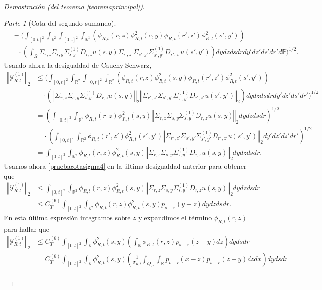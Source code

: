 \documentclass[letterpaper,twoside,12pt]{book}
\newcommand{\R}{\mathbb{R}}
\renewcommand{\P}{\mathbb{P}}
\newcommand{\1}{\mathds{1}}
\newcommand{\norm}[1]{\left\Vert #1 \right\Vert}
\theoremstyle{definition}
\theoremstyle{definition}
\theoremstyle{remark}
\newtheorem{proofpart}{Parte}
\theoremstyle{definition}
\theoremstyle{definition}
\theoremstyle{definition}
\theoremstyle{definition}
\theoremstyle{definition}
\begin{document}
\begin{proof}[Demostración (del teorema \ref{teoremaprincipal})]
\begin{proofpart}[Cota del segundo sumando]
\begin{align*}
   &=\Bigg(\int_{[0,t]^2}\int_{\R^2}\int_{[0,t]^2}\int_{\R^2}\left(\phi_{R,t}(r,z)\phi_{R,t}^2(s,y)\phi_{R,t}(r',z')\phi_{R,t}^2(s',y')\right)\\
   &\ \ \ \ \cdot \left(\int_\Omega\Sigma_{r,z}\Sigma_{s,y}\Sigma^{(1)}_{s,y}D_{r,z}u(s,y)\Sigma_{r',z'}\Sigma_{s',y'}\Sigma^{(1)}_{s',y'}D_{r',z'}u(s',y')\right) dy dz ds dr dy'dz'ds'dr'd\P\Bigg)^{1/2}.
 \end{align*}
 Usando ahora la desigualdad de Cauchy-Schwarz, 
 \begin{align*}
   \norm{\mathcal{Y}_{R,t}^{(1)}}_2&\leq \Bigg(\int_{[0,t]^2}\int_{\R^2}\int_{[0,t]^2}\int_{\R^2}\left(\phi_{R,t}(r,z)\phi_{R,t}^2(s,y)\phi_{R,t}(r',z')\phi_{R,t}^2(s',y')\right)\\
   &\ \ \ \ \cdot \left(\norm{\Sigma_{r,z}\Sigma_{s,y}\Sigma^{(1)}_{s,y}D_{r,z}u(s,y)}_2\norm{\Sigma_{r',z'}\Sigma_{s',y'}\Sigma^{(1)}_{s',y'}D_{r',z'}u(s',y')}_2\right) dy dz ds dr dy' dz' ds' dr'\Bigg)^{1/2}\\
   &=\left(\int_{[0,t]^2}\int_{\R^2}\phi_{R,t}(r,z)\phi_{R,t}^2(s,y)\norm{\Sigma_{r,z}\Sigma_{s,y}\Sigma^{(1)}_{s,y}D_{r,z}u(s,y)}_2dy dz ds dr\right)^{1/2}\\
   & \ \ \ \ \ \cdot \left(\int_{[0,t]^2}\int_{\R^2}\phi_{R,t}(r',z')\phi_{R,t}^2(s',y')\norm{\Sigma_{r',z'}\Sigma_{s',y'}\Sigma^{(1)}_{s',y'}D_{r',z'}u(s',y')}_2dy'dz'ds'dr'\right)^{1/2}\\
   &=\int_{[0,t]^2}\int_{\R^2}\phi_{R,t}(r,z)\phi_{R,t}^2(s,y)\norm{\Sigma_{r,z}\Sigma_{s,y}\Sigma^{(1)}_{s,y}D_{r,z}u(s,y)}_2dy dz ds dr.
 \end{align*}
 Usamos ahora \eqref{pruebacotasigma4} en la última desigualdad anterior para obtener que
 \begin{align*}
   \norm{\mathcal{Y}_{R,t}^{(1)}}_2&\leq\int_{[0,t]^2}\int_{\R^2}\phi_{R,t}(r,z)\phi_{R,t}^2(s,y)\norm{\Sigma_{r,z}\Sigma_{s,y}\Sigma^{(1)}_{s,y}D_{r,z}u(s,y)}_2dy dz ds dr\\
   &\leq C^{(6)}_T\int_{[0,t]^2}\int_{\R^2}\phi_{R,t}(r,z)\phi_{R,t}^2(s,y)p_{s-r}(y-z)dy dz ds dr.
\end{align*}
En esta última expresión integramos sobre $z$ y expandimos el término $\phi_{R,t}(r,z)$ para hallar que 
\begin{align*}
   \norm{\mathcal{Y}_{R,t}^{(1)}}_2&\leq C^{(6)}_T\int_{[0,t]^2}\int_{\R}\phi_{R,t}^2(s,y)\left(\int_\R\phi_{R,t}(r,z)p_{s-r}(z-y)dz\right)dy ds dr\\
   &=C^{(6)}_T\int_{[0,t]^2}\int_{\R}\phi_{R,t}^2(s,y)\left(\frac{1}{\sigma_{R,t}}\int_{Q_R}\int_\R p_{t-r}(x-z)p_{s-r}(z-y)dz dx\right)dy ds dr\\

\end{align*}
\end{proofpart}
\end{proof}
\end{document}
